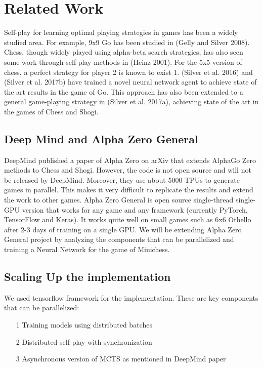 \documentclass[11pt]{article}
\begin{document}
\section{Related Work}

Self-play for learning optimal playing strategies in games has been a widely studied area. For example, 9x9 Go has been studied in (Gelly and Silver 2008). Chess, though widely played using alpha-beta search strategies, has also seen some work through self-play methods in (Heinz 2001). For the 5x5 version of chess, a perfect strategy for player 2 is known to exist 1. (Silver et al. 2016) and (Silver et al. 2017b) have trained a novel neural network agent to achieve state of the art results in the game of Go. This approach has also been extended to a general game-playing strategy in (Silver et al. 2017a), achieving state of the art in the games of Chess and Shogi. 

\subsection{Deep Mind and Alpha Zero General}
DeepMind published a ​paper​ of Alpha Zero on arXiv that extends AlphaGo Zero methods to Chess and Shogi. However, the code is not open source and will not be released by DeepMind. Moreover, they use about 5000 TPUs to generate games in parallel. This makes it very difficult to replicate the results and extend the work to other games. ​Alpha Zero General​ is open source single-thread single-GPU version that works for any game and any framework (currently PyTorch, TensorFlow and Keras). It works quite well on small games such as 6x6 Othello after ​2-3 days of training on a single GPU​. We will be extending Alpha Zero General project by analyzing the components that can be parallelized and training a Neural Network for the game of Minichess. 

\subsection{Scaling Up the implementation}
  We used tensorflow framework for the implementation. These are key components that can be parallelized: 
\begin{itemize}
\item[1] Training models using distributed batches 
\item[2] Distributed self-play with synchronization  
\item[3] Asynchronous version of MCTS as mentioned in DeepMind paper 
\end{itemize}
\end{document}
